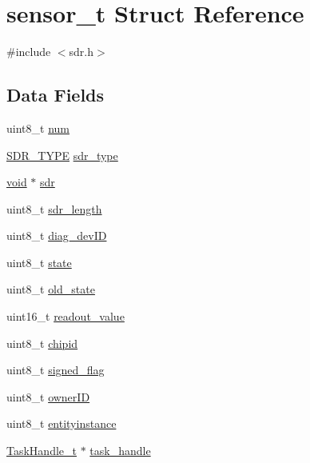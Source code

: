 \hypertarget{structsensor__t}{\section{sensor\-\_\-t Struct Reference}
\label{structsensor__t}
}


{\ttfamily \#include $<$sdr.\-h$>$}

\subsection*{Data Fields}
\begin{DoxyCompactItemize}
\item 
uint8\-\_\-t \hyperlink{structsensor__t_aa53d919c174719ce93176510d0411ad1}{num}
\item 
\hyperlink{sdr_8h_a10e294bdfc1f1db30fa28253ea74ac31}{S\-D\-R\-\_\-\-T\-Y\-P\-E} \hyperlink{structsensor__t_a74278fb69315b5cd273808049bef376f}{sdr\-\_\-type}
\item 
\hyperlink{Paradigm_2Tern__EE_2small_2portmacro_8h_a14d32f8130d3c0b212cfc751730b5b49}{void} $\ast$ \hyperlink{structsensor__t_ac51a6d13c757997e914b3d8087b7c8f3}{sdr}
\item 
uint8\-\_\-t \hyperlink{structsensor__t_a55561dda8b97c0b6e1fdee0d5f86dad4}{sdr\-\_\-length}
\item 
uint8\-\_\-t \hyperlink{structsensor__t_a3bde4fa4b5359922eaf87ba51a0b4b84}{diag\-\_\-dev\-I\-D}
\item 
uint8\-\_\-t \hyperlink{structsensor__t_aabe4ff291f14698bc3f9974512771256}{state}
\item 
uint8\-\_\-t \hyperlink{structsensor__t_a4b1293e20318142e7d0b2fa97958dab0}{old\-\_\-state}
\item 
uint16\-\_\-t \hyperlink{structsensor__t_a980a1654df48626dc529f4e517df3c34}{readout\-\_\-value}
\item 
uint8\-\_\-t \hyperlink{structsensor__t_a6f4da18e0f441fb708e3df7506263b65}{chipid}
\item 
uint8\-\_\-t \hyperlink{structsensor__t_a6ac509225e51d4a715004b82fc5f33bf}{signed\-\_\-flag}
\item 
uint8\-\_\-t \hyperlink{structsensor__t_aea9f6e8d77f9cf45e7bfae93bcf358a7}{owner\-I\-D}
\item 
uint8\-\_\-t \hyperlink{structsensor__t_a9916aa73072580999a282bb1b7ec5bc6}{entityinstance}
\item 
\hyperlink{task_8h_ae95f44d4cfeb4a599c6cc258d241cb6b}{Task\-Handle\-\_\-t} $\ast$ \hyperlink{structsensor__t_a2967640a1d19cc71bc0d3b6cfac5bac8}{task\-\_\-handle}

\end{DoxyCompactItemize}
